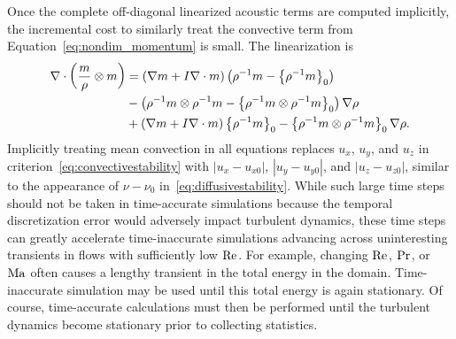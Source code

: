 Once the complete off-diagonal linearized acoustic terms are computed
implicitly, the incremental cost to similarly treat the convective term from
Equation~\eqref{eq:nondim_momentum} is small.  The linearization is
\begin{align}
  \nabla\cdot\left(\frac{m}{\rho}\otimes{}m\right)
&= \left(\nabla{}m + I \nabla\cdot{}m\right)\left({\rho^{-1}m}-\left\{\rho^{-1}m\right\}_{0}\right)
\notag\\
&{}- \left({\rho^{-1}m\otimes\rho^{-1}m}-\left\{\rho^{-1}m\otimes\rho^{-1}m\right\}_{0}\right)\nabla\rho
\notag\\
 &+ \left(\nabla{}m + I \nabla\cdot{}m\right)\left\{\rho^{-1}m\right\}_{0}
  - \left\{\rho^{-1}m\otimes\rho^{-1}m\right\}_{0}\nabla\rho.
\end{align}
Implicitly treating mean convection in all equations replaces $u_x$, $u_y$, and
$u_z$ in criterion~\eqref{eq:convectivestability} with
$\left|u_x-u_{x0}\right|$, $\left|u_y-u_{y0}\right|$, and
$\left|u_z-u_{z0}\right|$, similar to the appearance of $\nu-\nu_0$
in~\eqref{eq:diffusivestability}.  While such large time steps should not
be taken in time-accurate simulations because the temporal discretization error
would adversely impact
turbulent dynamics, these time steps can greatly accelerate time-inaccurate
simulations advancing across uninteresting transients in flows with
sufficiently low $\mbox{Re}_{}$.
%
\label{eq:bigtimesteps}
%
For example, changing $\mbox{Re}_{}$, $\mbox{Pr}_{}$,
or $\mbox{Ma}_{}$ often causes a lengthy transient in the total energy in the
domain.  Time-inaccurate simulation may be used until this total energy is again
stationary.  Of course, time-accurate calculations must then be
performed until the turbulent dynamics become stationary prior to collecting
statistics.

